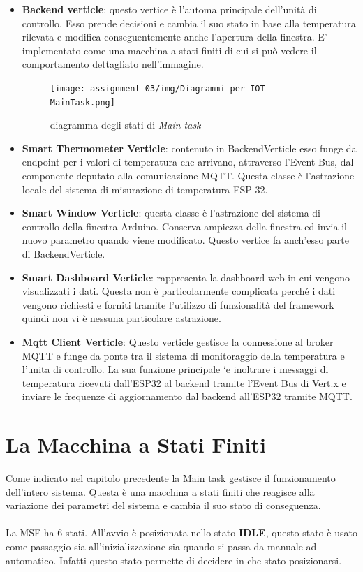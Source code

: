 \documentclass{report}
\begin{document}
\begin{itemize}
    \item {
    \textbf{Backend verticle}: questo vertice è l'automa principale dell'unità di controllo. Esso prende decisioni e cambia il suo stato in base alla temperatura rilevata e modifica conseguentemente anche l'apertura della finestra. E' implementato come una macchina a stati finiti di cui si può vedere il comportamento dettagliato nell'immagine.
    \begin{figure}[H]
        \centering
        \texttt{[image: assignment-03/img/Diagrammi per IOT - MainTask.png]}
        \caption{diagramma degli stati di \textit{Main task}}
        \label{fig:main-task}
    \end{figure}
    }
    \item {
    \textbf{Smart Thermometer Verticle}: contenuto in BackendVerticle esso funge da endpoint per i valori di temperatura che arrivano, attraverso l'Event Bus, dal componente deputato alla comunicazione MQTT. Questa classe è l'astrazione locale del sistema di misurazione di temperatura ESP-32.
    }
    \item {
    \textbf{Smart Window Verticle}: questa classe è l'astrazione del sistema di controllo della finestra Arduino. Conserva ampiezza della finestra ed invia il nuovo parametro quando viene modificato. Questo vertice fa anch'esso parte di BackendVerticle.
    }
    \item {
    \textbf{Smart Dashboard Verticle}: rappresenta la dashboard web in cui vengono visualizzati i dati. Questa non è particolarmente complicata perché i dati vengono richiesti e forniti tramite l'utilizzo di funzionalità del framework quindi non vi è nessuna particolare astrazione. 
    }
    \item{   
    \textbf{Mqtt Client Verticle}: Questo verticle gestisce la connessione al broker MQTT e funge da ponte tra il sistema di monitoraggio della temperatura e l'unita di controllo. La sua funzione principale `e inoltrare i messaggi di temperatura ricevuti dall'ESP32 al backend tramite l'Event Bus di Vert.x e inviare le frequenze di aggiornamento dal backend all'ESP32 tramite MQTT.
    }
\end{itemize}

\section{La Macchina a Stati Finiti}
Come indicato nel capitolo precedente la \hyperref[fig:main-task]{Main task} gestisce il funzionamento dell'intero sistema. Questa è una macchina a stati finiti che reagisce alla variazione dei parametri del sistema e cambia il suo stato di conseguenza. 
\\
\\
La MSF ha 6 stati. All'avvio è posizionata nello stato \textbf{IDLE}, questo stato è usato come passaggio sia all'inizializzazione sia quando si passa da manuale ad automatico. Infatti questo stato permette di decidere in che stato posizionarsi.
\end{document}
